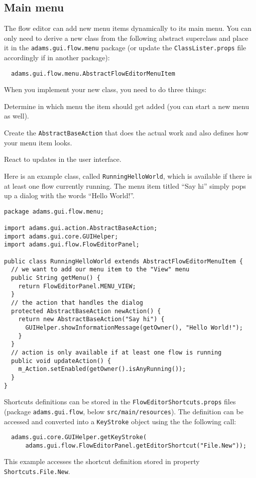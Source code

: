 \subsection{Main menu}
\label{floweditor_mainmenu}
The flow editor can add new menu items dynamically to its main menu. You can
only need to derive a new class from the following abstract superclass and
place it in the \texttt{adams.gui.flow.menu} package (or update the
\texttt{ClassLister.props} file accordingly if in another package):
\begin{verbatim}
  adams.gui.flow.menu.AbstractFlowEditorMenuItem
\end{verbatim}
When you implement your new class, you need to do three things:
\begin{tight_enumerate}
  \item Determine in which menu the item should get added (you can start a new
  menu as well).
  \item Create the \texttt{AbstractBaseAction} that does the actual work and
  also defines how your menu item looks.
  \item React to updates in the user interface.
\end{tight_enumerate}
Here is an example class, called \texttt{RunningHelloWorld}, which is available
if there is at least one flow currently running. The menu item titled ``Say hi'' 
simply pops up a dialog with the words ``Hello World!''.
{\scriptsize
\begin{verbatim}
package adams.gui.flow.menu;
  
import adams.gui.action.AbstractBaseAction;
import adams.gui.core.GUIHelper;
import adams.gui.flow.FlowEditorPanel;

public class RunningHelloWorld extends AbstractFlowEditorMenuItem {
  // we want to add our menu item to the "View" menu
  public String getMenu() {
    return FlowEditorPanel.MENU_VIEW;
  }
  // the action that handles the dialog
  protected AbstractBaseAction newAction() {
    return new AbstractBaseAction("Say hi") {
      GUIHelper.showInformationMessage(getOwner(), "Hello World!");
    }
  }
  // action is only available if at least one flow is running
  public void updateAction() {
    m_Action.setEnabled(getOwner().isAnyRunning());
  }
}
\end{verbatim}
}
Shortcuts definitions can be stored in the \texttt{FlowEditorShortcuts.props}
files (package \texttt{adams.gui.flow}, below \texttt{src/main/resources}). The
definition can be accessed and converted into a \texttt{KeyStroke} object using
the the following call:
\begin{verbatim}
  adams.gui.core.GUIHelper.getKeyStroke(
      adams.gui.flow.FlowEditorPanel.getEditorShortcut("File.New"));
\end{verbatim}
This example accesses the shortcut definition stored in property
\texttt{Shortcuts.File.New}.


